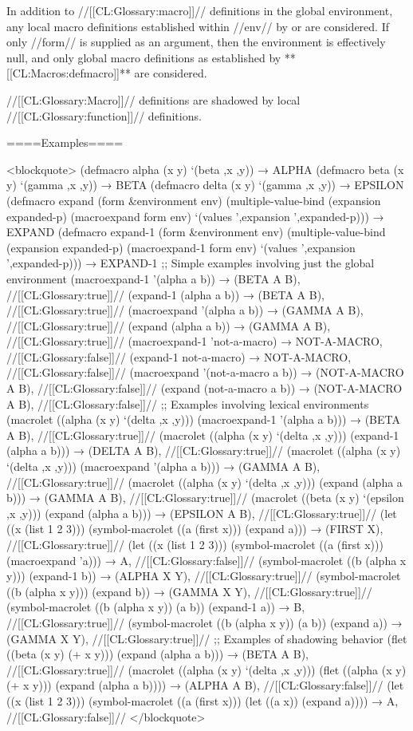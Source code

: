 In addition to //[[CL:Glossary:macro]]// definitions in the global environment, any local macro definitions established within //env// by  or  are considered. If only //form// is supplied as an argument, then the environment is effectively null, and only global macro definitions as established by **[[CL:Macros:defmacro]]** are considered.

//[[CL:Glossary:Macro]]// definitions are shadowed by local //[[CL:Glossary:function]]// definitions.

====Examples====

<blockquote> (defmacro alpha (x y) `(beta ,x ,y)) → ALPHA (defmacro beta (x y) `(gamma ,x ,y)) → BETA (defmacro delta (x y) `(gamma ,x ,y)) → EPSILON (defmacro expand (form &environment env) (multiple-value-bind (expansion expanded-p) (macroexpand form env) `(values ',expansion ',expanded-p))) → EXPAND (defmacro expand-1 (form &environment env) (multiple-value-bind (expansion expanded-p) (macroexpand-1 form env) `(values ',expansion ',expanded-p))) → EXPAND-1 \medbreak ;; Simple examples involving just the global environment (macroexpand-1 '(alpha a b)) → (BETA A B), //[[CL:Glossary:true]]// (expand-1 (alpha a b)) → (BETA A B), //[[CL:Glossary:true]]// (macroexpand '(alpha a b)) → (GAMMA A B), //[[CL:Glossary:true]]// (expand (alpha a b)) → (GAMMA A B), //[[CL:Glossary:true]]// (macroexpand-1 'not-a-macro) → NOT-A-MACRO, //[[CL:Glossary:false]]// (expand-1 not-a-macro) → NOT-A-MACRO, //[[CL:Glossary:false]]// (macroexpand '(not-a-macro a b)) → (NOT-A-MACRO A B), //[[CL:Glossary:false]]// (expand (not-a-macro a b)) → (NOT-A-MACRO A B), //[[CL:Glossary:false]]// \medbreak ;; Examples involving lexical environments (macrolet ((alpha (x y) `(delta ,x ,y))) (macroexpand-1 '(alpha a b))) → (BETA A B), //[[CL:Glossary:true]]// (macrolet ((alpha (x y) `(delta ,x ,y))) (expand-1 (alpha a b))) → (DELTA A B), //[[CL:Glossary:true]]// (macrolet ((alpha (x y) `(delta ,x ,y))) (macroexpand '(alpha a b))) → (GAMMA A B), //[[CL:Glossary:true]]// (macrolet ((alpha (x y) `(delta ,x ,y))) (expand (alpha a b))) → (GAMMA A B), //[[CL:Glossary:true]]// (macrolet ((beta (x y) `(epsilon ,x ,y))) (expand (alpha a b))) → (EPSILON A B), //[[CL:Glossary:true]]// (let ((x (list 1 2 3))) (symbol-macrolet ((a (first x))) (expand a))) → (FIRST X), //[[CL:Glossary:true]]// (let ((x (list 1 2 3))) (symbol-macrolet ((a (first x))) (macroexpand 'a))) → A, //[[CL:Glossary:false]]// (symbol-macrolet ((b (alpha x y))) (expand-1 b)) → (ALPHA X Y), //[[CL:Glossary:true]]// (symbol-macrolet ((b (alpha x y))) (expand b)) → (GAMMA X Y), //[[CL:Glossary:true]]// (symbol-macrolet ((b (alpha x y)) (a b)) (expand-1 a)) → B, //[[CL:Glossary:true]]// (symbol-macrolet ((b (alpha x y)) (a b)) (expand a)) → (GAMMA X Y), //[[CL:Glossary:true]]// \medbreak ;; Examples of shadowing behavior (flet ((beta (x y) (+ x y))) (expand (alpha a b))) → (BETA A B), //[[CL:Glossary:true]]// (macrolet ((alpha (x y) `(delta ,x ,y))) (flet ((alpha (x y) (+ x y))) (expand (alpha a b)))) → (ALPHA A B), //[[CL:Glossary:false]]// (let ((x (list 1 2 3))) (symbol-macrolet ((a (first x))) (let ((a x)) (expand a)))) → A, //[[CL:Glossary:false]]// </blockquote>

